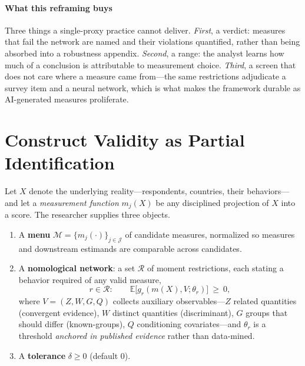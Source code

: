 \documentclass[11pt,letterpaper]{article}
\begin{document}
\paragraph{What this reframing buys} Three things a single-proxy practice cannot deliver. \emph{First}, a
verdict: measures that fail the network are named and their violations quantified, rather than being
absorbed into a robustness appendix. \emph{Second}, a range: the analyst learns how much of a conclusion is
attributable to measurement choice. \emph{Third}, a screen that does not care where a measure came from---the
same restrictions adjudicate a survey item and a neural network, which is what makes the framework durable as
AI-generated measures proliferate.

\section{Construct Validity as Partial Identification}
\label{sec:framework}

Let $X$ denote the underlying reality---respondents, countries, their behaviors---and let a
\emph{measurement function} $m_j(X)$ be any disciplined projection of $X$ into a score. The researcher
supplies three objects.

\begin{enumerate}[leftmargin=1.5em]
  \item A \textbf{menu} $\mathcal{M} = \{m_j(\cdot)\}_{j\in\mathcal{J}}$ of candidate measures, normalized so
  measures and downstream estimands are comparable across candidates.
  \item A \textbf{nomological network}: a set $\mathcal{R}$ of moment restrictions, each stating a behavior
  required of any valid measure,
  \begin{equation}
    r \in \mathcal{R}: \qquad \mathbb{E}\bigl[g_r(m(X), V; \theta_r)\bigr] \ \ge\ 0,
    \label{eq:restriction}
  \end{equation}
  where $V=(Z,W,G,Q)$ collects auxiliary observables---$Z$ related quantities (convergent evidence), $W$
  distinct quantities (discriminant), $G$ groups that should differ (known-groups), $Q$ conditioning
  covariates---and $\theta_r$ is a threshold \emph{anchored in published evidence} rather than data-mined.
  \item A \textbf{tolerance} $\delta \ge 0$ (default $0$).
\end{enumerate}
\end{document}
